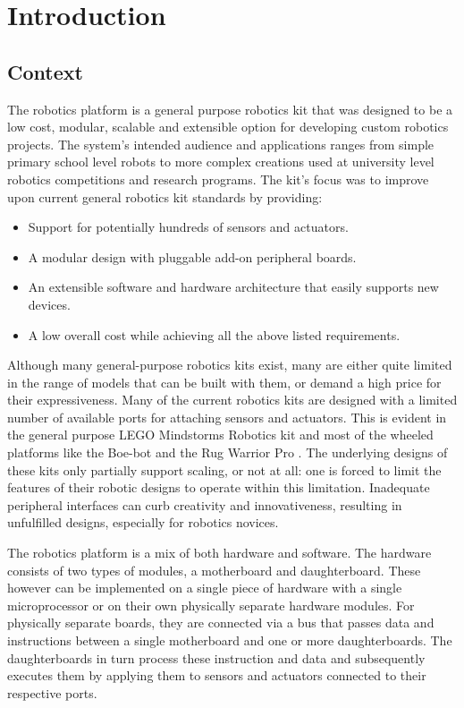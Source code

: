 \chapter{Introduction} 


\section{Context}
The \xten robotics platform is a general purpose robotics kit that was designed to be a low cost, modular, scalable and extensible option for developing custom robotics projects. The system's intended audience and applications ranges from simple primary school level robots to more complex creations used at university level robotics competitions and research programs. The \xten kit's focus was to improve upon current general robotics kit standards by providing:
\begin{itemize}
\item Support for potentially hundreds of sensors and actuators.
\item A modular design with pluggable add-on peripheral boards.
\item An extensible software and hardware architecture that easily supports new devices.
\item A low overall cost while achieving all the above listed requirements.
\end{itemize}

Although many general-purpose robotics kits exist, many are either quite limited in the range of models that can be built with them, or demand a high price for their expressiveness. Many of the current robotics kits are designed with a limited number of available ports for attaching sensors and actuators. This is evident in the general purpose LEGO Mindstorms Robotics kit and most of the wheeled platforms like the Boe-bot and the Rug Warrior Pro \cite{6frompaper}. The underlying designs of these kits only partially support scaling, or not at all: one is forced to limit the features of their robotic designs to operate within this limitation. Inadequate peripheral interfaces can curb creativity and innovativeness, resulting in unfulfilled designs, especially for robotics novices.

The \xten robotics platform is a mix of both hardware and software. The hardware consists of two types of modules, a motherboard and daughterboard. These however can be implemented on a single piece of hardware with a single microprocessor or on their own physically separate hardware modules. For physically separate boards, they are connected via a bus that passes data and instructions between a single motherboard and one or more daughterboards. The daughterboards in turn process these instruction and data and subsequently executes them by applying them to sensors and actuators connected to their respective ports.

